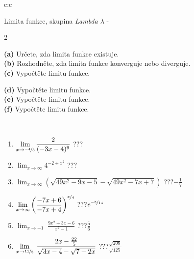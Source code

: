\documentclass[10pt]{report}
\begin{document}
\begin{tabular}{c:c}
\begin{minipage}[c][104.5mm][t]{0.5\linewidth}
\begin{center}
\vspace{7mm}
{\huge Limita funkce, skupina \textit{Lambda $\lambda$} -}\\[5mm]
\begin{minipage}{0.95\linewidth}
\begin{center}
{\small \begin{multicols}{2} \raggedright
\textbf{(a)} Určete, zda limita funkce existuje. \\[1mm]
\textbf{(b)} Rozhodněte, zda limita funkce konverguje nebo diverguje. \\[1mm]
\textbf{(c)} Vypočtěte limitu funkce. \par \columnbreak
\textbf{(d)} Vypočtěte limitu funkce. \\[1mm]
\textbf{(e)} Vypočtěte limitu funkce. \\[1mm]
\textbf{(f)} Vypočtěte limitu funkce. \\[1mm]
\end{multicols}
}
\end{center}
\end{minipage}
\\[4mm]
\begin{minipage}{0.79\linewidth}
\begin{center}
\begin{varwidth}{\linewidth}
\begin{enumerate}
\normalsize
\item $\displaystyle\lim_{x\to\nicefrac{-4}{3}}{\frac{2}{(-3x-4)^{9}}}$\quad \dotfill\; ???\;\dotfill \quad {}
\item $\displaystyle\lim_{x\to\infty}{4^{-2+x^2}}$\quad \dotfill\; ???\;\dotfill \quad {}
\item $\displaystyle\lim_{x\to\infty}{\left(\sqrt{49x^2-9x-5} - \sqrt{49x^2-7x+7}\right)}$\quad \dotfill\; ???\;\dotfill \quad $-\frac{1}{7}$
\item $\displaystyle\lim_{x\to\infty}{\left( \frac{-7x+6}{-7x+4} \right)^{\nicefrac{x}{4}}}$\quad \dotfill\; ???\;\dotfill \quad $e^{\nicefrac{-5}{14}}$
\item $\displaystyle\lim_{x\to -1}{\;\frac{9x^2+3x-6}{x^2-1}}$\quad \dotfill\; ???\;\dotfill \quad $\frac{5}{6}$
\item $\displaystyle\lim_{x\to \nicefrac{11}{5}}{\;\frac{2x-\frac{22}{5}}{\sqrt{3x-4} - \sqrt{7-2x}}}$\quad \dotfill\; ???\;\dotfill \quad $\frac{\sqrt{208}}{\sqrt{125}}$

\end{enumerate}
\end{varwidth}
\end{center}
\end{minipage}
\end{center}
\end{minipage}
\end{tabular}
\end{document}

